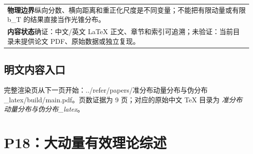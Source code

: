 \documentclass[UTF8,11pt,oneside]{ctexbook}
\begin{document}
\begin{table}[htbp]
\begin{tabular}{@{}p{}@{}}
    \textbf{物理边界}\quad 纵向分数、横向距离和重正化尺度是不同变量；不能把有限动量或有限 b\_T 的结果直接当作光锥分布。 \\
    \textbf{内容状态}\quad 确证：中文/英文 LaTeX 正文、章节和索引可追溯；未验证：当前目录未提供论文 PDF、原始数据或独立复现。 \\
    \bottomrule
  \end{tabular}
\end{table}
\section*{明文内容入口}
\noindent 完整渲染页从下一页开始：../\allowbreak{}refer/\allowbreak{}papers/\allowbreak{}准分布动量分布与伪分布\_\allowbreak{}latex/\allowbreak{}build/\allowbreak{}main.pdf。页数证据为 9 页；对应的原始中文 TeX 目录为 \emph{准分布动量分布与伪分布\_latex}。
\clearpage

\clearpage

\chapter{P18：大动量有效理论综述}
\end{document}
